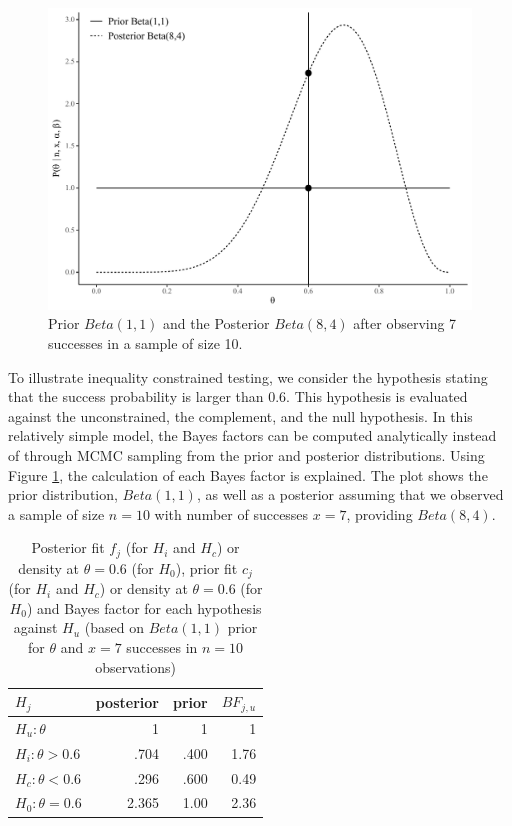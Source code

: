 \documentclass[11pt,reqno]{article}
\begin{document}
\begin{figure}[ht]
 \centerline{\includegraphics[width=12cm]{r-files-bes-klugkist-volker-2022/Figures/betaplot}}
 \caption{Prior $Beta(1,1)$ and the Posterior $Beta(8,4)$ after observing 7 successes in a sample of size 10.}
 \label{betaplot}
\end{figure}

To illustrate inequality constrained testing, we consider the hypothesis stating that the success probability is larger than 0.6.
This hypothesis is evaluated against the unconstrained, the complement, and the null hypothesis. In this relatively simple model, the Bayes factors can be computed analytically instead of through MCMC sampling from the prior and posterior distributions. Using Figure \ref{betaplot}, the calculation of each Bayes factor is explained. The plot shows the prior distribution, $Beta(1,1)$, as well as a posterior assuming that we observed a sample of size $n=10$ with number of successes $x=7$, providing $Beta(8,4)$.

\begin{table}[!h]
\caption{Posterior fit $f_j$ (for $H_i$ and $H_c$) or density at $\theta=0.6$ (for $H_0$), prior fit $c_j$ (for $H_i$ and $H_c$) or density at $\theta=0.6$ (for $H_0$) and Bayes factor for each hypothesis against $H_u$ (based on $Beta(1,1)$ prior for $\theta$ and $x=7$ successes in $n=10$ observations)}
\label{calcBF}
  \centering
     \begin{tabular}{lrrr}\hline
$H_j$                 & posterior   & prior  & $BF_{j,u}$   \\ \hline
$H_u: \theta$        & 1     & 1     & 1       \\
$H_i: \theta>0.6$    & .704  & .400  & 1.76    \\
$H_c: \theta<0.6$    & .296  & .600  & 0.49    \\
$H_0: \theta=0.6$    & 2.365 & 1.00  & 2.36    \\ \hline
\end{tabular}
\end{table}
\end{document}
